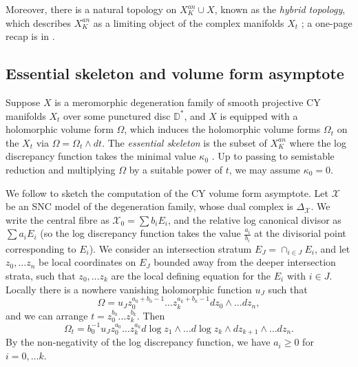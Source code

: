 \documentclass[a4paper]{article}
\theoremstyle{definition}
\begin{document}
	
	
	
	
	
	
	Moreover, there is a natural topology on $X_K^{an}\cup X$, known as the \emph{hybrid topology}, which describes $X_K^{an}$ as a limiting object of the complex manifolds $X_t$ \cite[Appendix]{Boucksom1}\cite[Section 1.2]{PilleSchneider}; a one-page recap is in \cite[section 2.2]{Liintermediate}. 
	
	
	
	
	
	
	
	
	\subsection{Essential skeleton and volume form asymptote}\label{section:essentialskeleton}
	
	
	Suppose $X$ is a meromorphic degeneration family of smooth projective CY manifolds $X_t$ over some punctured disc $\mathbb{D}^*$, and $X$ is equipped with a holomorphic volume form $\Omega$, which induces the holomorphic volume forms $\Omega_t$ on the $X_t$ via $\Omega= \Omega_t\wedge dt$. The \emph{essential skeleton} is the subset of $X_K^{an}$ where the log discrepancy function takes the minimal value $\kappa_0$ \cite[Section 3.1.1]{NicaiseXu}.  Up to passing to semistable reduction and multiplying $\Omega$ by a suitable power of $t$, we may assume $\kappa_0=0$.
	
	
	
	We follow \cite{Boucksom1} to sketch the computation of the CY volume form asymptote. Let $\mathcal{X}$ be an SNC model of the degeneration family, whose dual complex is $\Delta_{\mathcal{X}}$. We write the central fibre as $\mathcal{X}_0=\sum b_iE_i$, and the relative log canonical divisor as $\sum a_i E_i$ (so the log discrepancy function takes the value $\frac{a_i}{b_i}$ at the divisorial point corresponding to $E_i$). We consider an intersection stratum $E_J= \cap_{i\in J} E_i$, and let $z_0,\ldots z_n$ be local coordinates on $E_J$ bounded away from the deeper intersection strata, such that $z_0,\ldots z_k$ are the local defining equation for the $E_i$ with $i\in J$. Locally there is a nowhere vanishing holomorphic function $u_J$ such that
	\[
	\Omega=u_J z_0^{a_0+b_0-1}\ldots z_k^{a_k+b_k-1} dz_0\wedge \ldots  dz_n,
	\]
	and we can arrange
	$
	t= z_0^{b_0}\ldots z_k^{b_k} .
	$
	Then
	\begin{equation}\label{holovollocal}
		\Omega_t= b_0^{-1} u_J z_0^{a_0}\ldots z_k^{a_k} d\log z_1\wedge \ldots d\log z_k\wedge dz_{k+1}\wedge \ldots dz_n.
	\end{equation}
	By the non-negativity of the log discrepancy function, we have $a_i\geq 0$ for $i=0,\ldots k$.
\end{document}
